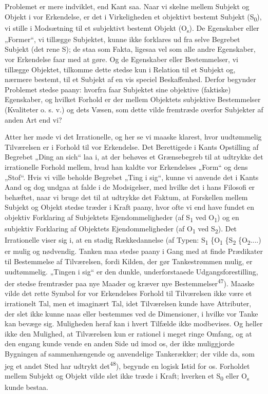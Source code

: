 \documentclass[12pt,a4paper,openany]{book}
\newcommand{\opage}[1]{\marginnote{\footnotesize\textit{[#1]}}}
\begin{document}
Problemet er mere indviklet, end Kant saa. Naar vi skelne mellem Subjekt og
Objekt i vor Erkendelse, er det i Virkeligheden et objektivt bestemt Subjekt
(S\textsubscript{0}), vi stille i Modsætning til et subjektivt bestemt Objekt
(O\textsubscript{s}). %
 De Egenskaber eller „Former“, vi tillægge Subjektet, kunne ikke forklares ud
fra selve Begrebet Subjekt (det rene S); de staa som Fakta, ligesaa vel som
alle andre Egenskaber, vor Erkendelse faar med at gøre. Og de Egenskaber eller
Bestemmelser, vi tillægge Objektet, tilkomme dette stedse kun i Relation til et
Subjekt og, nærmere bestemt, til et Subjekt af en vis speciel Beskaffenhed.
Derfor begynder Problemet stedse paany: hvorfra faar Subjektet sine objektive
(faktiske) Egenskaber, og hvilket Forhold er der mellem Objektets subjektive
Bestemmelser (Kvaliteter o. s. v.) og dets Væsen, som dette vilde fremtræde
overfor Subjekter af anden Art end vi?

Atter her møde vi det Irrationelle, og her se vi maaske
\opage{51}klarest, hvor uudtømmelig Tilværelsen er i Forhold til vor
Erkendelse. Det Berettigede i Kants Opstilling af Begrebet „Ding an sich“ laa
i, at der behøves et Grænsebegreb til at udtrykke det irrationelle Forhold
mellem, hvad han kaldte vor Erkendelses „Form“ og dens „Stof“. Hvis vi ville
beholde Begrebet „Ting i sig“, kunne vi anvende det i Kants Aand og dog undgaa
at falde i de Modsigelser, med hvilke det i hans Filosofi er behæftet, naar vi
bruge det til at udtrykke det Faktum, at Forskellen mellem Subjekt og Objekt
stedse træder i Kraft paany, hvor ofte vi end have fundet en objektiv
Forklaring af Subjektets Ejendommeligheder (af S\textsubscript{1} ved
O\textsubscript{1}) og en subjektiv Forklaring af Objektets Ejendommeligheder
(af O\textsubscript{1} ved S\textsubscript{2}). Det Irrationelle viser sig i,
at en stadig Rækkedannelse (af Typen: S\textsubscript{1} \{O\textsubscript{1}
\{S\textsubscript{2} \{O\textsubscript{2}....) er mulig og nødvendig. Tanken
maa stedse paany i Gang med at finde Prædikater til Bestemmelse af Tilværelsen,
fordi Kilden, der gør Tankestrømmen mulig, er uudtømmelig. „Tingen i sig“ er
den dunkle, underforstaaede Udgangsforestilling, der stedse fremtræder paa nye
Maader og kræver nye Bestemmelser\textsuperscript{47}). Maaske vilde det rette
Symbol for vor Erkendelses Forhold til Tilværelsen ikke være et irrationelt
Tal, men et imaginært Tal, idet Tilværelsen kunde have Attributer, der slet
ikke kunne naas eller bestemmes ved de Dimensioner, i hvilke vor Tanke kan
bevæge sig. Muligheden heraf kan i hvert Tilfælde ikke modbevises. Og heller
ikke den Mulighed, at Tilværelsen kun er rationel i meget ringe Omfang, og at
den engang kunde vende en anden Side ud imod os, der ikke muliggjorde Bygningen
af sammenhængende og anvendelige Tankerækker; der vilde da, som jeg et andet
Sted har udtrykt det\textsuperscript{48}), begynde en logisk Istid for os.
Forholdet mellem Subjekt og Objekt vilde slet ikke træde i Kraft; hverken et
S\textsubscript{0} eller O\textsubscript{s} %
 kunde bestaa.
\end{document}
